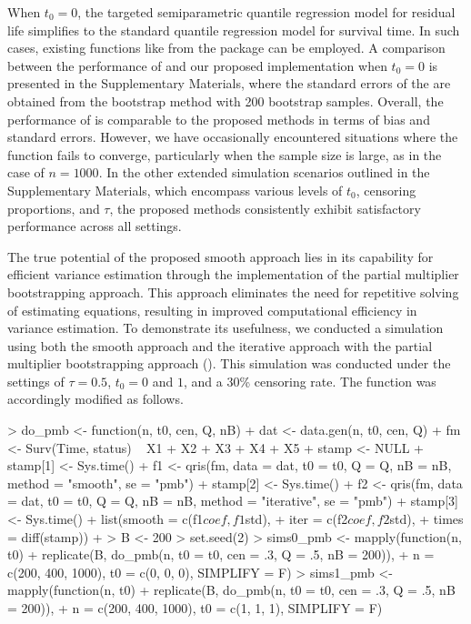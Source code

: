 When $t_0 = 0$, the targeted semiparametric quantile regression model for residual life 
simplifies to the standard quantile regression model for survival time. 
In such cases, existing functions like  from the  package \citep{quantregpackage}
can be employed.
A comparison between the performance of  and our proposed implementation 
when $t_0 = 0$ is presented in the Supplementary Materials, 
where the standard errors of the  are obtained from the bootstrap method with 200 bootstrap samples. 
Overall, the performance of  is comparable to the proposed methods in terms of bias and standard errors. 
However, we have occasionally encountered situations where the  function fails to converge, 
particularly when the sample size is large, as in the case of $n = 1000$. 
In the other extended simulation scenarios outlined in the Supplementary Materials, 
which encompass various levels of $t_0$, censoring proportions, and $\tau$, 
the proposed methods consistently exhibit satisfactory performance across all settings.


The true potential of the proposed smooth approach lies in its capability for 
efficient variance estimation through the implementation of the partial multiplier bootstrapping approach. 
This approach eliminates the need for repetitive solving of estimating equations, 
resulting in improved computational efficiency in variance estimation. 
To demonstrate its usefulness, we conducted a simulation using both the smooth approach 
and the iterative approach with the partial multiplier bootstrapping approach (). 
This simulation was conducted under the settings of $\tau = 0.5$, $t_0 = 0$ and $1$, 
and a 30\% censoring rate. 
The  function was accordingly modified as follows.

\begin{example}
  > do_pmb <- function(n, t0, cen, Q, nB) {
  +   dat <- data.gen(n, t0, cen, Q)
  +   fm <- Surv(Time, status) ~ X1 + X2 + X3 + X4 + X5
  +   stamp <- NULL
  +   stamp[1] <- Sys.time()
  +   f1 <- qris(fm, data = dat, t0 = t0, Q = Q, nB = nB, method = "smooth", se = "pmb")
  +   stamp[2] <- Sys.time()
  +   f2 <- qris(fm, data = dat, t0 = t0, Q = Q, nB = nB, method = "iterative", se = "pmb")
  +   stamp[3] <- Sys.time()
  +   list(smooth = c(f1$coef, f1$std),
  +     iter = c(f2$coef, f2$std),
  +     times = diff(stamp))
  + }
  > B <- 200
  > set.seed(2)
  > sims0_pmb <- mapply(function(n, t0)
  +   replicate(B, do_pmb(n, t0 = t0, cen = .3, Q = .5, nB = 200)),
  +   n = c(200, 400, 1000), t0 = c(0, 0, 0), SIMPLIFY = F)
  > sims1_pmb <- mapply(function(n, t0)
  +   replicate(B, do_pmb(n, t0 = t0, cen = .3, Q = .5, nB = 200)),
  +   n = c(200, 400, 1000), t0 = c(1, 1, 1), SIMPLIFY = F)
\end{example}
% 

